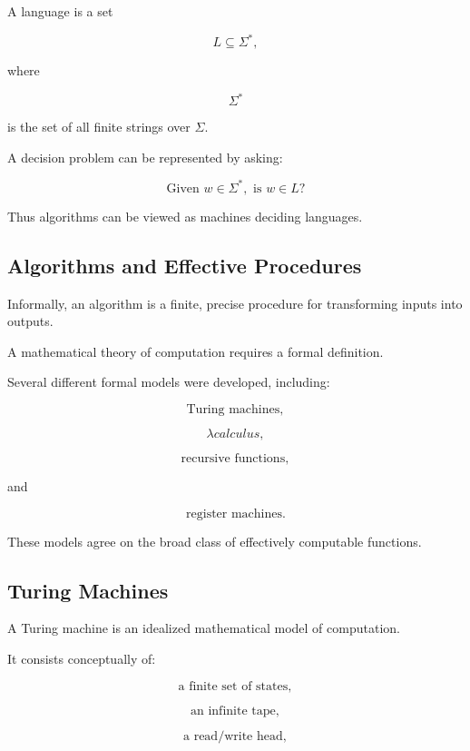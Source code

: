 A language is a set

\[
\boxed{
L\subseteq\Sigma^*,
}
\]

where

\[
\Sigma^*
\]

is the set of all finite strings over \(\Sigma\).

A decision problem can be represented by asking:

\[
\boxed{
\text{Given }w\in\Sigma^*,
\text{ is }w\in L?
}
\]

Thus algorithms can be viewed as machines deciding languages.

\subsection{Algorithms and Effective Procedures}
\label{subsec:effective-procedures}

Informally, an algorithm is a finite, precise procedure for transforming
inputs into outputs.

A mathematical theory of computation requires a formal definition.

Several different formal models were developed, including:

\[
\boxed{
\text{Turing machines},
}
\]

\[
\boxed{
\lambda calculus},
\]

\[
\boxed{
\text{recursive functions},
}
\]

and

\[
\boxed{
\text{register machines}.
}
\]

These models agree on the broad class of effectively computable functions.

\subsection{Turing Machines}
\label{subsec:turing-machines}

A Turing machine is an idealized mathematical model of computation.

It consists conceptually of:

\[
\boxed{
\text{a finite set of states},
}
\]

\[
\boxed{
\text{an infinite tape},
}
\]

\[
\boxed{
\text{a read/write head},
}
\]

